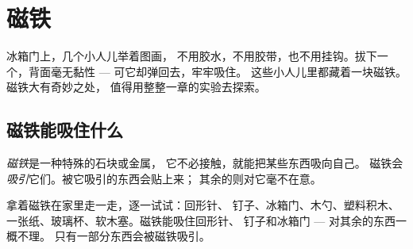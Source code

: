\chapter{磁铁}\label{ch:g1:magnets}

冰箱门上，几个小人儿举着图画，
不用胶水，不用胶带，也不用挂钩。拔下一个，背面毫无黏性 ---
可它却弹回去，牢牢吸住。
这些小人儿里都藏着一块磁铁。磁铁大有奇妙之处，
值得用整整一章的实验去探索。

\section{磁铁能吸住什么}

\begin{definition}[磁铁]\label{def:g1:magnets:magnet}
\emph{磁铁}是一种特殊的石块或金属，
它不必接触，就能把某些东西吸向自己。
磁铁会\emph{吸引}它们。被它吸引的东西会贴上来；
其余的则对它毫不在意。
\end{definition}

\begin{example}\label{ex:g1:magnets:test}
拿着磁铁在家里走一走，逐一试试：回形针、
钉子、冰箱门、木勺、塑料积木、
一张纸、玻璃杯、软木塞。磁铁能吸住回形针、
钉子和冰箱门 --- 对其余的东西一概不理。
只有一部分东西会被磁铁吸引。
\end{example}

